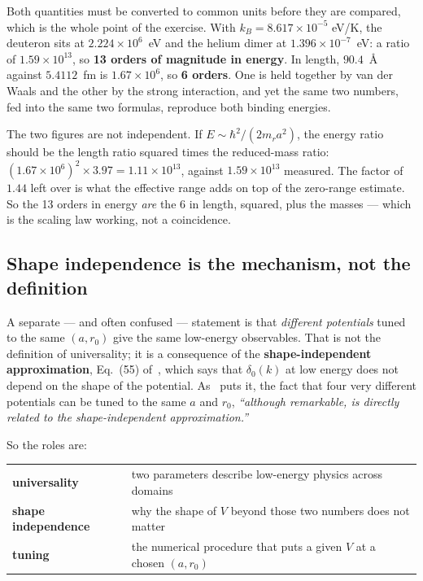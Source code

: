 \documentclass[11pt,a4paper]{article}
\begin{document}
Both quantities must be converted to common units before they are compared,
which is the whole point of the exercise. With $k_B = 8.617\times10^{-5}$
eV/K, the deuteron sits at $2.224\times10^{6}$~eV and the helium dimer at
$1.396\times10^{-7}$~eV: a ratio of $1.59\times10^{13}$, so \textbf{13 orders of
magnitude in energy}. In length, $90.4$~\AA{} against $5.4112$~fm is
$1.67\times10^{6}$, so \textbf{6 orders}. One is held together by van der Waals
and the other by the strong interaction, and yet the same two numbers, fed into
the same two formulas, reproduce both binding energies.

The two figures are not independent. If $E \sim \hbar^2/(2m_r a^2)$, the energy
ratio should be the length ratio squared times the reduced-mass ratio:
$(1.67\times10^{6})^2 \times 3.97 = 1.11\times10^{13}$, against
$1.59\times10^{13}$ measured. The factor of $1.44$ left over is what the
effective range adds on top of the zero-range estimate. So the 13 orders in
energy \emph{are} the 6 in length, squared, plus the masses --- which is the
scaling law working, not a coincidence.

\subsection*{Shape independence is the mechanism, not the definition}

A separate --- and often confused --- statement is that \emph{different
potentials} tuned to the same $(a, r_0)$ give the same low-energy observables.
That is not the definition of universality; it is a consequence of the
\textbf{shape-independent approximation}, Eq.~(55) of~\cite{rbef}, which says
that $\delta_0(k)$ at low energy does not depend on the shape of the potential.
As~\cite{rbef} puts it, the fact that four very different potentials can be
tuned to the same $a$ and $r_0$, \emph{``although remarkable, is directly
related to the shape-independent approximation.''}

So the roles are:

\begin{center}
\begin{tabular}{ll}
\toprule
\textbf{universality} & two parameters describe low-energy physics across domains \\
\textbf{shape independence} & why the shape of $V$ beyond those two numbers does not matter \\
\textbf{tuning} & the numerical procedure that puts a given $V$ at a chosen $(a, r_0)$ \\
\bottomrule
\end{tabular}
\end{center}
\end{document}
